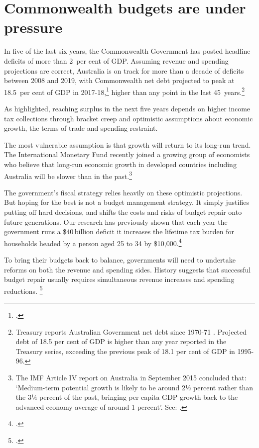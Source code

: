 \chapter{Commonwealth budgets are under pressure}
In five of the last six years, the Commonwealth Government has posted headline deficits of more than 2~per cent of GDP\@.
Assuming revenue and spending projections are correct, Australia is on track for more than a decade of deficits between 2008 and 2019, with Commonwealth net debt projected to peak at 18.5~per cent of GDP in 2017-18,\footcite[][1]{Treasury2015MYEFO201516} higher than any point in the last 45~years.\footnote{Treasury reports Australian Government net debt since 1970-71 \textcite[273]{Treasury2014-MYEFO-2014-15}. Projected debt of 18.5 per cent of GDP is higher than any year reported in the Treasury series, exceeding the previous peak of 18.1 per cent of GDP in 1995-96.}
 
As  highlighted, reaching surplus in the next five years depends on higher income tax collections through bracket creep and optimistic assumptions about economic growth, the terms of trade and spending restraint.
 
The most vulnerable assumption is that growth will return to its long-run trend. The International Monetary Fund recently joined a growing group of economists who believe that long-run economic growth in developed countries including Australia will be slower than in the past.\footnote{The IMF Article IV report on Australia in September 2015 concluded that: ‘Medium-term potential growth is likely to be around 2½ percent rather than the 3¼ percent of the past, bringing per capita GDP growth back to the advanced economy average of around 1 percent’. See: \textcite[][11]{IMF2015b}.}

The government’s fiscal strategy relies heavily on these optimistic projections. But hoping for the best is not a budget management strategy. It simply justifies putting off hard decisions, and shifts the costs and risks of budget repair onto future generations. Our research has previously shown that each year the government runs a \$40\,billion deficit it increases the lifetime tax burden for households headed by a person aged 25 to 34 by \$10,000.\footcite[][9]{DaleyWoodWeidmannEtAl2014}

 
To bring their budgets back to balance, governments will need to undertake reforms on both the revenue and spending sides. History suggests that successful budget repair usually requires simultaneous revenue increases and spending reductions. \footcite[][16]{Daley2013}
 
